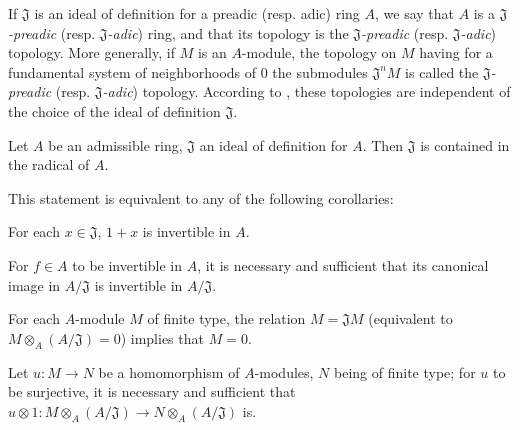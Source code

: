 If $\mathfrak{J}$ is an ideal of definition for a preadic (resp. adic) ring
$A$, we say that $A$ is a \emph{$\mathfrak{J}$-preadic}
(resp. \emph{$\mathfrak{J}$-adic}) ring, and that its topology is the
\emph{$\mathfrak{J}$-preadic} (resp. \emph{$\mathfrak{J}$-adic}) topology. More
generally, if $M$ is an $A$-module, the topology on $M$ having for a fundamental
system of neighborhoods of $0$ the submodules $\mathfrak{J}^n M$ is called the
\emph{$\mathfrak{J}$-preadic} (resp. \emph{$\mathfrak{J}$-adic}) topology.
According to , these topologies are independent of the choice
of the ideal of definition $\mathfrak{J}$.

\begin{proposition}[7.1.10]
\label{0.7.1.10}
Let $A$ be an admissible ring, $\mathfrak{J}$ an ideal of definition for $A$.
Then $\mathfrak{J}$ is contained in the radical of $A$.
\end{proposition}

This statement is equivalent to any of the following corollaries:
\begin{corollary}[7.1.11]
\label{0.7.1.11}
For each $x\in\mathfrak{J}$, $1+x$ is invertible in $A$.
\end{corollary}

\begin{corollary}[7.1.12]
\label{0.7.1.12}
For $f\in A$ to be invertible in $A$, it is necessary and sufficient that its
canonical image in $A/\mathfrak{J}$ is invertible in $A/\mathfrak{J}$.
\end{corollary}

\begin{corollary}[7.1.13]
\label{0.7.1.13}
For each $A$-module $M$ of finite type, the relation $M=\mathfrak{J}M$
(equivalent to $M\otimes_A(A/\mathfrak{J})=0$) implies that $M=0$.
\end{corollary}

\begin{corollary}[7.1.14]
\label{0.7.1.14}
Let $u:M\to N$ be a homomorphism of $A$-modules, $N$ being of finite type; for
$u$ to be surjective, it is necessary and sufficient that
$u\otimes 1:M\otimes_A(A/\mathfrak{J})\to N\otimes_A(A/\mathfrak{J})$ is.
\end{corollary}

